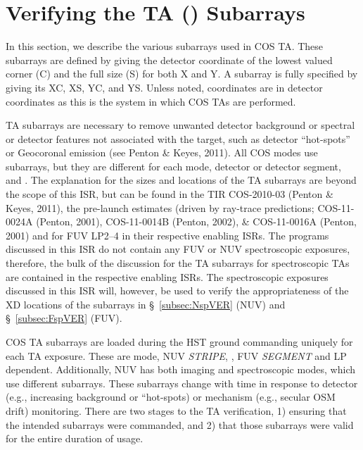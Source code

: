 \section{Verifying the TA (\tacq{}) Subarrays}\label{sec:subarray}
In this section, we describe the various subarrays used in COS TA.
These subarrays are defined by giving the detector coordinate of the lowest valued corner (C) and the full size (S) for both X and Y.
A subarray is fully specified by giving its XC, XS, YC, and YS. Unless noted, coordinates are in detector coordinates as this is the system in which COS TAs are performed.

TA subarrays are necessary to remove unwanted detector background or spectral or detector features not associated with the target, such as detector
``hot-spots'' or Geocoronal emission (see Penton \& Keyes, 2011). All COS \tacq{} modes use subarrays, but they are different for each mode, detector or detector segment,
and \cenwave{}.  The explanation for the sizes and locations of the TA subarrays are beyond the scope of this ISR, but can be found in the TIR COS-2010-03 (Penton \& Keyes, 2011),
the pre-launch estimates (driven by ray-trace predictions; COS-11-0024A (Penton, 2001), COS-11-0014B (Penton, 2002), \& COS-11-0016A (Penton, 2001) and for
FUV LP2--4 in their respective enabling ISRs.
The programs discussed in this ISR do not contain any FUV or NUV spectroscopic \tacq{} exposures, therefore, the bulk of the discussion for the TA subarrays for
spectroscopic TAs are contained in the respective enabling ISRs. The spectroscopic exposures discussed in this ISR will, however, be used to verify
the appropriateness of the XD locations of the subarrays in \S~\ref{subsec:NspVER} (NUV) and \S~\ref{subsec:FspVER} (FUV).

COS TA subarrays are loaded during the HST ground commanding uniquely for each TA exposure.
These are \tacq{} mode, NUV \textit{STRIPE}, \cenwave{}, FUV \textit{SEGMENT} and LP dependent.
Additionally, NUV  has both imaging and spectroscopic modes, which use different subarrays.
These subarrays change with time in response to detector (e.g., increasing background or ``hot-spots)
or mechanism (e.g., secular OSM drift) monitoring.
There are two stages to the TA verification,
1) ensuring that the intended subarrays were commanded, and
2) that those subarrays were valid for the entire duration of usage.


